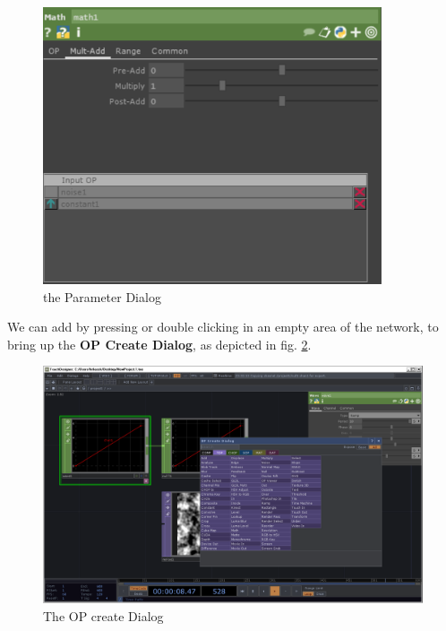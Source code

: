 \begin{figure}[H]
	\begin{center}
		\includegraphics[width = 10cm]{img/parameterDialog.png}
		\caption{the Parameter Dialog}
		\label{fig:parDialog}
	\end{center}
\end{figure}

We can add \OPs by pressing  or double clicking in an empty area of the network, to bring up the \textbf{OP Create Dialog}, as depicted in fig. \ref{fig:opCreate}. \\

\begin{figure}[H]
	\begin{center}
		\includegraphics[width = 14cm]{img/opCreate.png}
		\caption{The OP create Dialog}
		\label{fig:opCreate}
	\end{center}
\end{figure}




